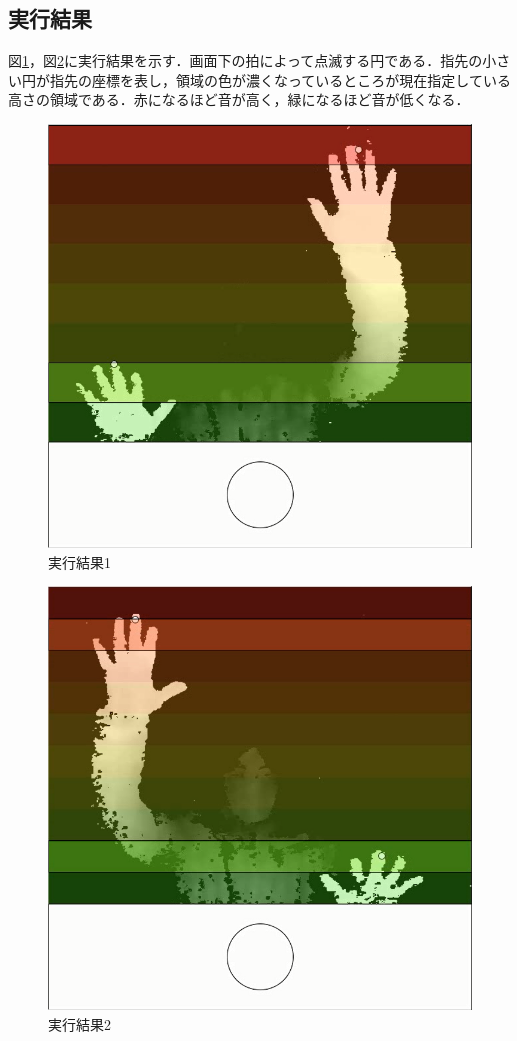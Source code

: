 \subsection{実行結果}
図\ref{img:interface_result1}，図\ref{img:interface_result3}に実行結果を示す．画面下の拍によって点滅する円である．指先の小さい円が指先の座標を表し，領域の色が濃くなっているところが現在指定している高さの領域である．赤になるほど音が高く，緑になるほど音が低くなる．
\begin{figure}[t]
	\begin{center}
		\includegraphics[width=0.5\linewidth]{assets/img/result1.png}
		\caption{実行結果1}
		\label{img:interface_result1}
	\end{center}
\end{figure}
\begin{figure}[t]
	\begin{center}
		\includegraphics[width=0.5\linewidth]{assets/img/result3.png}
		\caption{実行結果2}
		\label{img:interface_result3}
	\end{center}
\end{figure}
